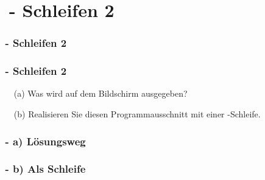 \def\stitle{\theexercise\ - Schleifen 2}
\section{\stitle}
\begin{frame}
  \frametitle{\stitle}%
\tableofcontents[current]
\end{frame}

\begin{frame}[t]%
    \frametitle{\stitle}



\begin{itemize}
\item[(a)] Was wird auf dem Bildschirm ausgegeben?
\item[(b)] Realisieren Sie diesen Programmausschnitt mit einer -Schleife.
\end{itemize}
\end{frame}


\begin{frame}[fragile]%
 \frametitle{\theexercise\ - a) L\"osungsweg}%

\end{frame}


\begin{frame}[fragile]%
 \frametitle{\theexercise\ - b) Als  Schleife}%

\end{frame}
